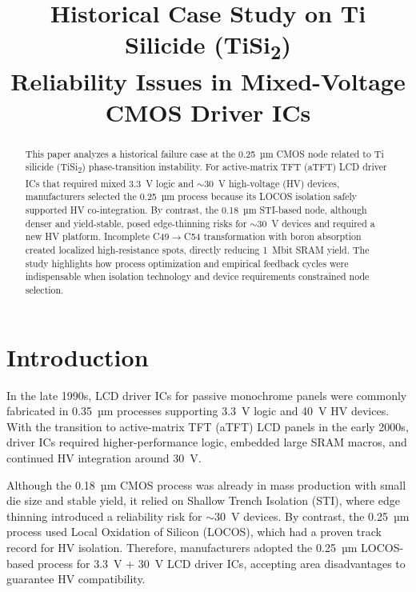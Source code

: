 \documentclass[conference]{IEEEtran}
\begin{document}
\title{Historical Case Study on Ti Silicide (TiSi\textsubscript{2}) \\ Reliability Issues in Mixed-Voltage CMOS Driver ICs}

\author{
}

\maketitle

\begin{abstract}
This paper analyzes a historical failure case at the 0.25~µm CMOS node related to Ti silicide (TiSi\textsubscript{2}) phase-transition instability.
For active-matrix TFT (aTFT) LCD driver ICs that required mixed 3.3~V logic and $\sim$30~V high-voltage (HV) devices, manufacturers selected the 0.25~µm process because its LOCOS isolation safely supported HV co-integration.
By contrast, the 0.18~µm STI-based node, although denser and yield-stable, posed edge-thinning risks for $\sim$30~V devices and required a new HV platform.
Incomplete C49$\rightarrow$C54 transformation with boron absorption created localized high-resistance spots, directly reducing 1~Mbit SRAM yield.
The study highlights how process optimization and empirical feedback cycles were indispensable when isolation technology and device requirements constrained node selection.
\end{abstract}

\section{Introduction}
In the late 1990s, LCD driver ICs for passive monochrome panels were commonly fabricated in 0.35~µm processes supporting 3.3~V logic and 40~V HV devices.
With the transition to active-matrix TFT (aTFT) LCD panels in the early 2000s, driver ICs required higher-performance logic, embedded large SRAM macros, and continued HV integration around 30~V.

Although the 0.18~µm CMOS process was already in mass production with small die size and stable yield, it relied on Shallow Trench Isolation (STI), where edge thinning introduced a reliability risk for $\sim$30~V devices.
By contrast, the 0.25~µm process used Local Oxidation of Silicon (LOCOS), which had a proven track record for HV isolation.
Therefore, manufacturers adopted the 0.25~µm LOCOS-based process for 3.3~V + 30~V LCD driver ICs, accepting area disadvantages to guarantee HV compatibility.
\end{document}
